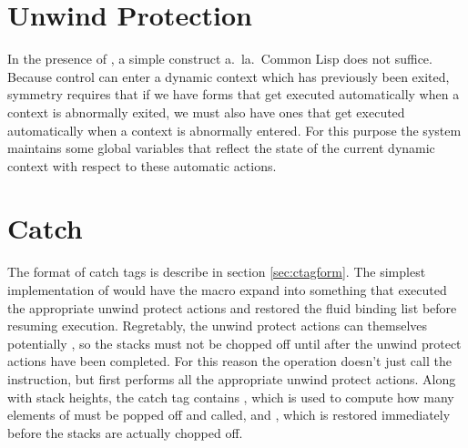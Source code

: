 \section{Unwind Protection} \label{sec:oakwind}

In the presence of , a simple 
construct a.\ la.\ Common Lisp does not suffice.  Because control can
enter a dynamic context which has previously been exited, symmetry
requires that if we have forms that get executed automatically when a
context is abnormally exited, we must also have ones that get executed
automatically when a context is abnormally entered.  For this purpose
the system maintains some global variables that reflect the state of
the current dynamic context with respect to these automatic actions.




\section{Catch} \label{sec:oakcatch}

The format of catch tags is describe in section \ref{sec:ctagform}.
The simplest implementation of  would have the
 macro expand into something that executed the
appropriate unwind protect actions and restored the fluid binding list
before resuming execution.  Regretably, the unwind protect actions can
themselves potentially , so the stacks must not be chopped
off until after the unwind protect actions have been completed.  For
this reason the  operation doesn't just call the 
instruction, but first performs all the appropriate unwind protect
actions.  Along with stack heights, the catch tag contains
, which is used to compute how many elements of
 must be popped off and called, and
, which is restored immediately before
the stacks are actually chopped off.


